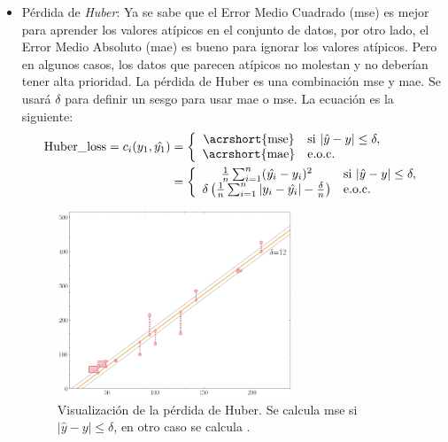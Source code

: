 \begin{itemize}
\item Pérdida de \textit{Huber}\cite{huber_loss}\label{huber_loss}: Ya se sabe que el Error Medio Cuadrado (\acrshort{mse}) es mejor para aprender los valores atípicos en el conjunto de datos, por otro lado, el Error Medio Absoluto (\acrshort{mae}) es bueno para ignorar los valores atípicos. Pero en algunos casos, los datos que parecen atípicos no molestan y no deberían tener alta prioridad. La pérdida de Huber es una combinación \acrshort{mse} y \acrshort{mae}. Se usará $\delta$ para definir un sesgo para usar \acrshort{mae} o \acrshort{mse}. La ecuación es la siguiente:
\begin{equation}
\centering
    \begin{split}
    \text{Huber\_loss} = c_i(y_1, \hat{y_1}) &= \left\{ 
        \begin{array}{cl} 
            \text{\acrshort{mse}} & \text{si }|\hat{y}-y| \le \delta, \\
            \text{\acrshort{mae}} & \text{e.o.c.}
        \end{array}\right. \\ &= \left\{ 
        \begin{array}{cl} 
            \frac{1}{n} \sum_{i=1}^n (\hat{y_i} - y_i)^2 & \text{si }|\hat{y}-y| \le \delta, \\
            \delta \left(\frac{1}{n} \sum_{i=1}^n |y_i - \hat{y_i}|-\frac{\delta}{n}\right) & \text{e.o.c.}
        \end{array}\right.
    \end{split}
\end{equation}

\begin{figure}[H]
    \centering
    \includegraphics[width=7cm]{images/state-of-art/cost-function/huber.png}
    \caption{Visualización de la pérdida de Huber. Se calcula \acrshort{mse} si $|\hat{y}-y| \le \delta$, en otro caso se calcula .}
    \label{fig:error_mae}
\end{figure}



\end{itemize}
